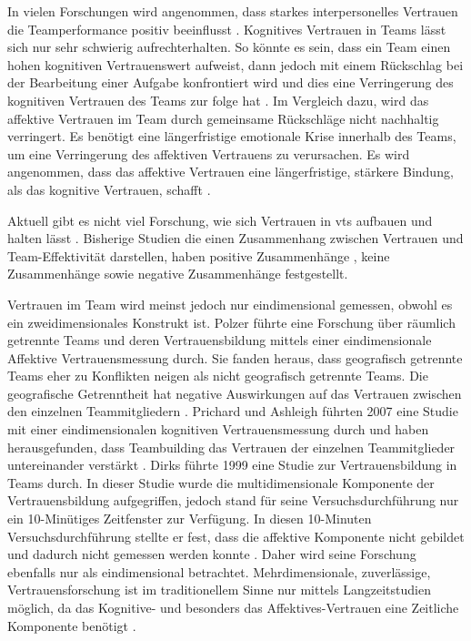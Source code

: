 \documentclass[a4paper,11pt]{article}%
\renewcommand{\\}{\vspace*{0.5\baselineskip} \newline}
\begin{document}
In vielen Forschungen wird angenommen, dass starkes interpersonelles Vertrauen die Teamperformance positiv beeinflusst \citep{mcallister1995affect} \citep{mayer1995integrative} \citep{dirks2002trust}.
Kognitives Vertrauen in Teams lässt sich nur sehr schwierig aufrechterhalten. So könnte es sein, dass ein Team einen hohen kognitiven Vertrauenswert aufweist, dann jedoch mit einem Rückschlag bei der Bearbeitung einer Aufgabe konfrontiert wird und dies eine Verringerung des kognitiven Vertrauen des Teams zur folge hat \citep[p.29-31]{mcallister1995affect}.
Im Vergleich dazu, wird das affektive Vertrauen im Team durch gemeinsame Rückschläge nicht nachhaltig verringert. Es benötigt eine längerfristige emotionale Krise innerhalb des Teams, um eine Verringerung des affektiven Vertrauens zu verursachen. Es wird angenommen, dass das affektive Vertrauen eine längerfristige, stärkere Bindung, als das kognitive Vertrauen, schafft \citep[p.29-31]{mcallister1995affect}.

Aktuell gibt es nicht viel Forschung, wie sich Vertrauen in \ac{vts} aufbauen und halten lässt \citep[p.8-23]{duarte2006mastering}.
Bisherige Studien die einen Zusammenhang zwischen Vertrauen und Team-Effektivität darstellen, haben positive Zusammenhänge \citep{davis2000trusted}, keine Zusammenhänge \citep{hertel2004managing} sowie negative Zusammenhänge \citep{dirks1999effects} festgestellt.

Vertrauen im Team wird meinst jedoch nur eindimensional gemessen, obwohl es ein zweidimensionales Konstrukt ist.
Polzer führte eine Forschung über räumlich getrennte Teams und deren Vertrauensbildung mittels einer eindimensionale Affektive Vertrauensmessung durch. Sie fanden heraus, dass geografisch getrennte Teams eher zu Konflikten neigen als nicht geografisch getrennte Teams. Die geografische Getrenntheit hat negative Auswirkungen auf das Vertrauen zwischen den einzelnen Teammitgliedern \citep[p.682]{polzer2006extending}.
Prichard und Ashleigh führten 2007 eine Studie mit einer eindimensionalen kognitiven Vertrauensmessung durch und haben herausgefunden, dass Teambuilding das Vertrauen der einzelnen Teammitglieder untereinander verstärkt \citep[p.704]{prichard2007effects}.
Dirks führte 1999 eine Studie zur Vertrauensbildung in Teams durch. In dieser Studie wurde die multidimensionale Komponente der Vertrauensbildung aufgegriffen, jedoch stand für seine Versuchsdurchführung nur ein 10-Minütiges Zeitfenster zur Verfügung. In diesen 10-Minuten Versuchsdurchführung stellte er fest, dass die affektive Komponente nicht gebildet und dadurch nicht gemessen werden konnte \citep[p.445]{mayer1995integrative}. Daher wird seine Forschung ebenfalls nur als eindimensional betrachtet.
Mehrdimensionale, zuverlässige, Vertrauensforschung ist im traditionellem Sinne nur mittels Langzeitstudien möglich, da das Kognitive- und besonders das Affektives-Vertrauen eine Zeitliche Komponente benötigt \citep{jones1998experience}.
\end{document}
